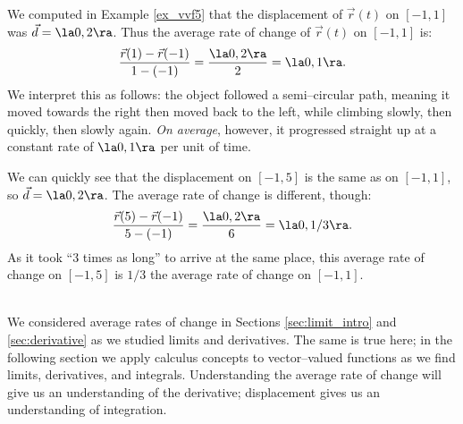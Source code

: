 {We computed in Example \ref{ex_vvf5} that the displacement of $\vec r(t)$ on $[-1,1]$ was $\vec d = \la 0,2\ra$. Thus the average rate of change of $\vec r(t)$ on $[-1,1]$ is:
$$\frac{\vec r(1) -\vec r(-1)}{1-(-1)} = \frac{\la 0,2\ra}{2} = \la 0,1\ra.$$
We interpret this as follows: the object followed a semi--circular path, meaning it moved towards the right then moved back to the left, while climbing slowly, then quickly, then slowly again. \emph{On average}, however, it progressed straight up at a constant rate of $\la 0,1\ra$ per unit of time.

We can quickly see that the displacement on $[-1,5]$ is the same as on $[-1,1]$, so $\vec d = \la 0,2\ra$. The average rate of change is different, though:
$$\frac{\vec r(5)-\vec r(-1)}{5-(-1)} = \frac{\la 0,2\ra}{6} = \la 0,1/3\ra.$$
As it took ``3 times as long'' to arrive at the same place, this average rate of change on $[-1,5]$ is $1/3$ the average rate of change on $[-1,1]$.
}\\

We considered average rates of change in Sections \ref{sec:limit_intro} and \ref{sec:derivative} as we studied limits and derivatives. The same is true here; in the following section we apply calculus concepts to vector--valued functions as we find limits, derivatives, and integrals. Understanding the average rate of change will give us an understanding of the derivative; displacement gives us an understanding of integration.

